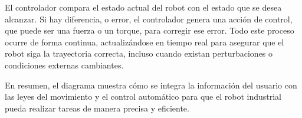 El controlador compara el estado actual del robot con el estado que se desea alcanzar. Si hay diferencia, o error, el controlador genera una acción de control, que puede ser una fuerza o un torque, para corregir ese error. Todo este proceso ocurre de forma continua, actualizándose en tiempo real para asegurar que el robot siga la trayectoria correcta, incluso cuando existan perturbaciones o condiciones externas cambiantes.

En resumen, el diagrama muestra cómo se integra la información del usuario con las leyes del movimiento y el control automático para que el robot industrial pueda realizar tareas de manera precisa y eficiente.



